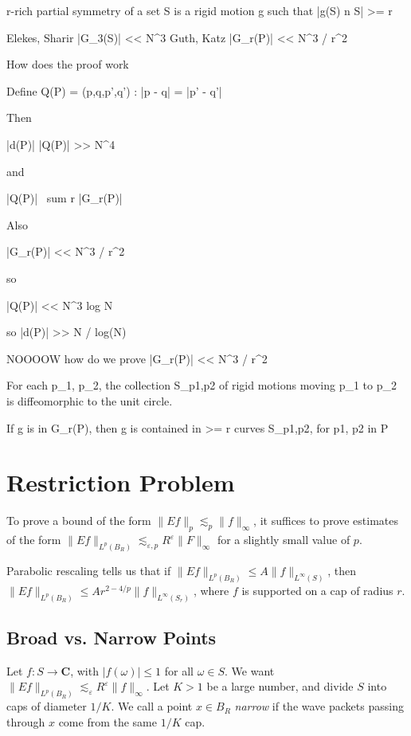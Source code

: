 r-rich partial symmetry of a set S is a rigid motion g such that |g(S) n S| >= r

Elekes, Sharir |G_3(S)| << N^3
Guth, Katz |G_r(P)| << N^3 / r^2


How does the proof work

Define Q(P) = { (p,q,p',q') : |p - q| = |p' - q'| }

Then

	|d(P)| |Q(P)| >> N^4

and

	|Q(P)|~  sum r |G_r(P)|

Also
	
	|G_r(P)| << N^3 / r^2

so
	
	|Q(P)| << N^3 log N

so |d(P)| >> N / log(N)

NOOOOW how do we prove |G_r(P)| << N^3 / r^2


	For each p_1, p_2, the collection S_{p1,p2} of rigid motions moving p_1 to p_2 is diffeomorphic to the unit circle.

	If g is in G_r(P), then g is contained in >= r curves S_{p1,p2}, for p1, p2 in P








\chapter{Restriction Problem}

To prove a bound of the form $\| Ef \|_p \lesssim_p \| f \|_\infty$, it suffices to prove estimates of the form $\| Ef \|_{L^p(B_R)} \lesssim_{\varepsilon,p} R^\varepsilon \| F \|_\infty$ for a slightly small value of $p$.

Parabolic rescaling tells us that if $\| Ef \|_{L^p(B_R)} \leq A \| f \|_{L^\infty(S)}$, then $\| Ef \|_{L^p(B_R)} \leq A r^{2 - 4/p} \| f \|_{L^\infty(S_r)}$, where $f$ is supported on a cap of radius $r$.

\section{Broad vs. Narrow Points}

Let $f: S \to \mathbf{C}$, with $|f(\omega)| \leq 1$ for all $\omega \in S$. We want $\| Ef \|_{L^p(B_R)} \lesssim_\varepsilon R^\varepsilon \| f \|_{\infty}$. Let $K > 1$ be a large number, and divide $S$ into caps of diameter $1/K$. We call a point $x \in B_R$ {\it narrow} if the wave packets passing through $x$ come from the same $1/K$ cap.

